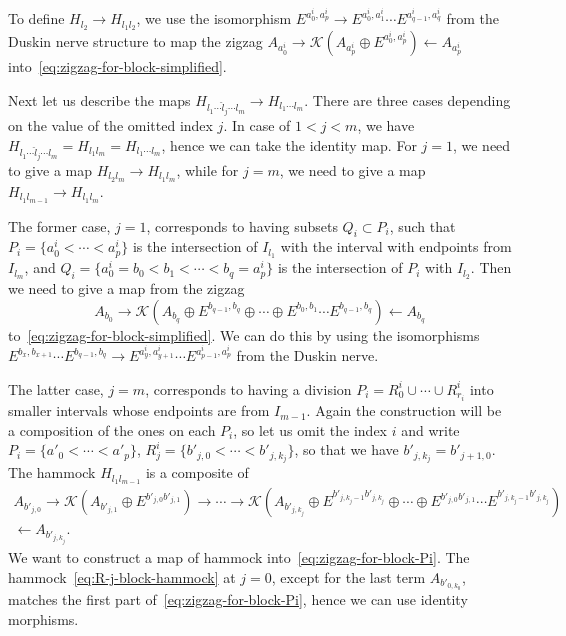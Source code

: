 \documentclass[a4paper,reqno]{amsart}
\theoremstyle{plain}
\theoremstyle{definition}
\theoremstyle{remark}
\numberwithin{equation}{section}
\newcommand{\cK}{\mathcal{K}}
\begin{document}
To define $H_{l_2} \to H_{l_1 l_2}$, we use the isomorphism $E^{a^i_0, a^i_p} \to E^{a^i_0, a^i_1} \cdots E^{a^i_{q-1}, a^i_q}$ from the Duskin nerve structure to map the zigzag $A_{a^i_0} \to \cK(A_{a^i_p} \oplus E^{a^i_0, a^i_p}) \leftarrow A_{a^i_p}$ into~\eqref{eq:zigzag-for-block-simplified}.

Next let us describe the maps $H_{l_1 \cdots \hat{l}_j \cdots l_m} \to H_{l_1 \cdots l_m}$.
There are three cases depending on the value of the omitted index $j$.
In case of $1 < j < m$, we have $H_{l_1 \cdots \hat{l}_j \cdots l_m} = H_{l_1 l_m} = H_{l_1 \cdots l_m}$, hence we can take the identity map.
For $j = 1$, we need to give a map $H_{l_2 l_m} \to H_{l_1 l_m}$, while for $j = m$, we need to give a map $H_{l_1 l_{m-1}} \to H_{l_1 l_m}$.

The former case, $j = 1$, corresponds to having subsets $Q_i \subset P_i$, such that $P_i = \{ a^i_0 < \cdots < a^i_p \}$ is the intersection of $I_{l_1}$ with the interval with endpoints from $I_{l_m}$, and $Q_i = \{a^i_0 = b_0 < b_1 < \cdots < b_q = a^i_p \}$ is the intersection of $P_i$ with $I_{l_2}$.
Then we need to give a map from the zigzag
\[
A_{b_0} \to \cK(A_{b_q} \oplus E^{b_{q-1}, b_q} \oplus \cdots \oplus E^{b_0, b_1} \cdots E^{b_{q-1}, b_q}) \leftarrow A_{b_q}
\]
to~\eqref{eq:zigzag-for-block-simplified}.
We can do this by using the isomorphisms $E^{b_x, b_{x+1}} \cdots E^{b_{q-1}, b_q} \to E^{a^i_y, a^i_{y+1}} \cdots E^{a^i_{p-1}, a^i_p}$ from the Duskin nerve.

The latter case, $j = m$, corresponds to having a division $P_i = R^i_0 \cup \cdots \cup R^i_{r_i}$ into smaller intervals whose endpoints are from $I_{m-1}$.
Again the construction will be a composition of the ones on each $P_i$, so let us omit the index $i$ and write $P_i = \{ a'_0 < \cdots < a'_p\}$, $R^i_{j} = \{b'_{j, 0} < \cdots < b'_{j, k_j}\}$, so that we have $b'_{j, k_j} = b'_{j+1,0}$.
The hammock $H_{l_1 l_{m-1}}$ is a composite of
\begin{multline}\label{eq:R-j-block-hammock}
A_{b'_{j,0}} \to \cK(A_{b'_{j,1}} \oplus E^{b'_{j,0} b'_{j,1}}) \to \cdots \to \cK(A_{b'_{j,k_j}} \oplus E^{b'_{j,k_j-1} b'_{j,k_j}} \oplus \cdots \oplus E^{b'_{j,0} b'_{j,1}} \cdots E^{b'_{j,k_j-1} b'_{j,k_j}}) \\ 
\leftarrow A_{b'_{j,k_j}}.
\end{multline}
We want to construct a map of hammock into~\eqref{eq:zigzag-for-block-Pi}.
The hammock~\eqref{eq:R-j-block-hammock} at $j = 0$, except for the last term $A_{b'_{0,k_0}}$, matches the first part of~\eqref{eq:zigzag-for-block-Pi}, hence we can use identity morphisms.
\end{document}

